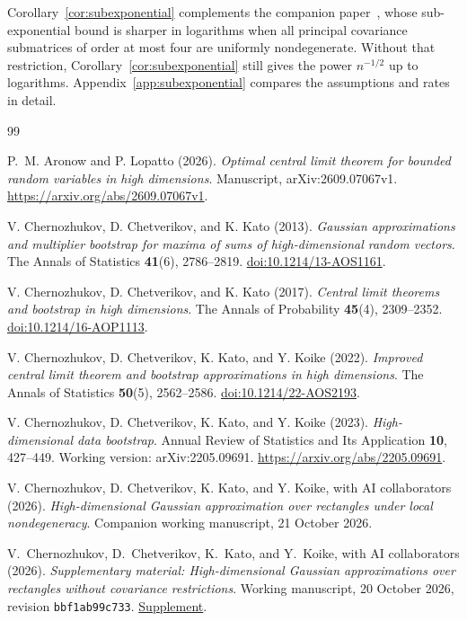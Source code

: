 \documentclass[11pt,letterpaper]{article}
\newif\ifshowpolish
\newcommand{\polish}[1]{\ifshowpolish{\color{magenta}%
\hypersetup{linkcolor=magenta,citecolor=magenta,urlcolor=magenta}#1}\else#1\fi}
\newif\ifshowrev
\newcommand{\rev}[1]{\ifshowrev{\color{revblue}%
\hypersetup{linkcolor=revblue,citecolor=revblue,urlcolor=revblue}#1}\else#1\fi}
\newif\ifshowskill
\newcommand{\skl}[1]{\ifshowskill{\color{revblue}%
\hypersetup{linkcolor=revblue,citecolor=revblue,urlcolor=revblue}#1}\else#1\fi}
\newif\ifshowintro
\newcommand{\itx}[1]{\ifshowintro{\color{revblue}%
\hypersetup{linkcolor=revblue,citecolor=revblue,urlcolor=revblue}#1}\else#1\fi}
\theoremstyle{remark}
\begin{document}
\rev{Corollary~\ref{cor:subexponential} complements the companion
paper~\cite{Local}, whose sub-exponential bound is sharper in logarithms
when all principal covariance submatrices of order at most four are
uniformly nondegenerate. Without that restriction,
Corollary~\ref{cor:subexponential} still gives the power \(n^{-1/2}\) up
to logarithms. Appendix~\ref{app:subexponential} compares the
assumptions and rates in detail.}


\begin{thebibliography}{99}
{}
P.~M. Aronow and P. Lopatto (2026).
\emph{Optimal central limit theorem for bounded random variables in high dimensions}.
Manuscript, arXiv:2609.07067v1.
\url{https://arxiv.org/abs/2609.07067v1}.

V. Chernozhukov, D. Chetverikov, and K. Kato (2013).
\emph{Gaussian approximations and multiplier bootstrap for maxima of
sums of high-dimensional random vectors}.
The Annals of Statistics \textbf{41}(6), 2786--2819.
\href{https://doi.org/10.1214/13-AOS1161}{doi:10.1214/13-AOS1161}.

V. Chernozhukov, D. Chetverikov, and K. Kato (2017).
\emph{Central limit theorems and bootstrap in high dimensions}.
The Annals of Probability \textbf{45}(4), 2309--2352.
\href{https://doi.org/10.1214/16-AOP1113}{doi:10.1214/16-AOP1113}.

V. Chernozhukov, D. Chetverikov, K. Kato, and Y. Koike (2022).
\emph{Improved central limit theorem and bootstrap approximations in
high dimensions}. The Annals of Statistics \textbf{50}(5), 2562--2586.
\href{https://doi.org/10.1214/22-AOS2193}{doi:10.1214/22-AOS2193}.

\itx{V. Chernozhukov, D. Chetverikov, K. Kato, and Y. Koike (2023).
\emph{High-dimensional data bootstrap}.
Annual Review of Statistics and Its Application \textbf{10}, 427--449.
Working version: arXiv:2205.09691.
\url{https://arxiv.org/abs/2205.09691}.}

V. Chernozhukov, D. Chetverikov, K. Kato, and Y. Koike,
with AI collaborators (2026).
\emph{High-dimensional Gaussian approximation over rectangles under
local nondegeneracy}. Companion working manuscript\skl{, 21 October 2026}.

\polish{V.~Chernozhukov, D.~Chetverikov, K.~Kato, and Y.~Koike,
with AI collaborators (2026).
\emph{Supplementary material: High-dimensional Gaussian approximations
over rectangles without covariance restrictions}.
Working manuscript, 20 October 2026, revision \texttt{bbf1ab99c733}.
\href{https://github.com/VC2015/HDCLTs/blob/bbf1ab99c733a398c181ca8c9f5a243a41f258c6/research-rectangle-clt-singular/Rectangle_CLT_Supplement.pdf}{Supplement}.}


\end{thebibliography}
\end{document}
